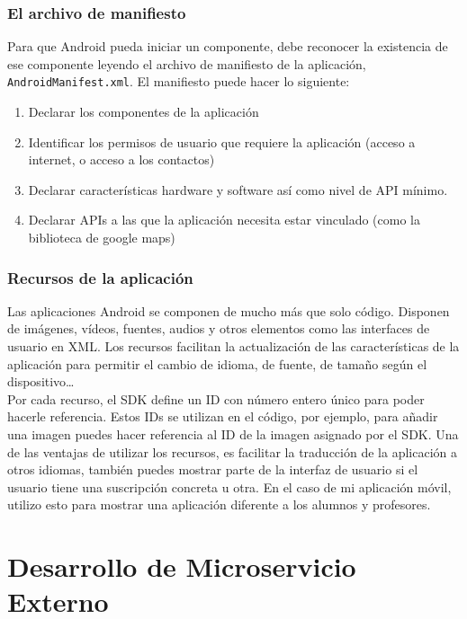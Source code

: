 \subsubsection{El archivo de manifiesto}

Para que Android pueda iniciar un componente, debe reconocer la existencia de ese componente leyendo el archivo de manifiesto de la aplicación, \verb|AndroidManifest.xml|. El manifiesto puede hacer lo siguiente:
\begin{enumerate}
    \item Declarar los componentes de la aplicación
    \item Identificar los permisos de usuario que requiere la aplicación (acceso a internet, o acceso a los contactos)
    \item Declarar características hardware y software así como nivel de API mínimo.
    \item Declarar APIs a las que la aplicación necesita estar vinculado (como la biblioteca de google maps)
\end{enumerate}

\subsubsection{Recursos de la aplicación}

Las aplicaciones Android se componen de mucho más que solo código. Disponen de imágenes, vídeos, fuentes, audios y otros elementos como las interfaces de usuario en XML. Los recursos facilitan la actualización de las características de la aplicación para permitir el cambio de idioma, de fuente, de tamaño según el dispositivo\dots \\

Por cada recurso, el SDK define un ID con número entero único para poder hacerle referencia. Estos IDs se utilizan en el código, por ejemplo, para añadir una imagen puedes hacer referencia al ID de la imagen asignado por el SDK. Una de las ventajas de utilizar los recursos, es facilitar la traducción de la aplicación a otros idiomas, también puedes mostrar parte de la interfaz de usuario si el usuario tiene una suscripción concreta u otra. En el caso de mi aplicación móvil, utilizo esto para mostrar una aplicación diferente  a los alumnos y profesores.



\section{Desarrollo de Microservicio Externo}

